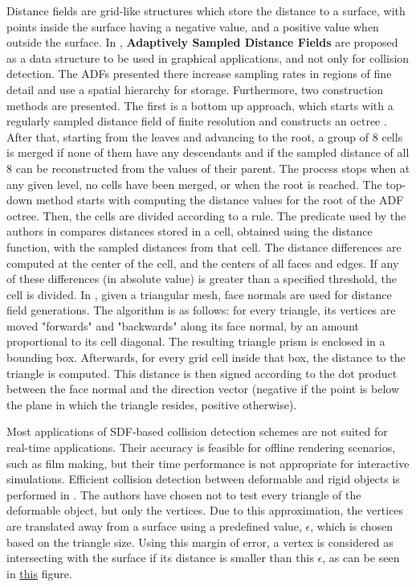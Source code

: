 Distance fields are grid-like structures which store the distance to a surface, with points inside the surface having a negative value, and a positive value when outside the surface. In \citep{fris00}, \textbf{Adaptively Sampled Distance Fields} are proposed as a data structure to be used in graphical applications, and not only for collision detection. The ADFs presented there increase sampling rates in regions of fine detail and use a spatial hierarchy for storage. Furthermore, two construction methods are presented. The first is a bottom up approach, which starts with a regularly sampled distance field of finite resolution and constructs an octree \citep{fris00}. After that, starting from the leaves and advancing to the root, a group of 8 cells is merged if none of them have any descendants and if the sampled distance of all 8 can be reconstructed from the values of their parent. The process stops when at any given level, no cells have been merged, or when the root is reached. The top-down method starts with computing the distance values for the root of the ADF octree. Then, the cells are divided according to a rule. The predicate used by the authors in \citep{fris00} compares distances stored in a cell, obtained using the distance function, with the sampled distances from that cell. The distance differences are computed at the center of the cell, and the centers of all faces and edges. If any of these differences (in absolute value) is greater than a specified threshold, the cell is divided. In \citep{fsg03}, given a triangular mesh, face normals are used for distance field generations. The algorithm is as follows: for every triangle, its vertices are moved "forwards" and "backwards" along its face normal, by an amount proportional to its cell diagonal. The resulting triangle prism is enclosed in a bounding box. Afterwards, for every grid cell inside that box, the distance to the triangle is computed. This distance is then signed according to the dot product between the face normal and the direction vector (negative if the point is below the plane in which the triangle resides, positive otherwise).


Most applications of SDF-based collision detection schemes are not suited for real-time applications. Their accuracy is feasible for offline rendering scenarios, such as film making, but their time performance is not appropriate for interactive simulations. Efficient collision detection between deformable and rigid objects is performed in \cite{fsg03}. The authors have chosen not to test every triangle of the deformable object, but only the vertices. Due to this approximation, the vertices are translated away from a surface using a predefined value, $\epsilon$, which is chosen based on the triangle size. Using this margin of error, a vertex is considered as intersecting with the surface if its distance is smaller than this $\epsilon$, as can be seen in \hyperref[img:sdf-eps]{this} figure.




